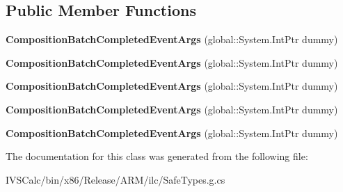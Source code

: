 \subsection*{Public Member Functions}
\begin{DoxyCompactItemize}
\item 
\mbox{\label{class_windows_1_1_u_i_1_1_composition_1_1_composition_batch_completed_event_args_afd03a8487feb85c144e6916a181ecdc1}} 
{\bfseries Composition\+Batch\+Completed\+Event\+Args} (global\+::\+System.\+Int\+Ptr dummy)
\item 
\mbox{\label{class_windows_1_1_u_i_1_1_composition_1_1_composition_batch_completed_event_args_afd03a8487feb85c144e6916a181ecdc1}} 
{\bfseries Composition\+Batch\+Completed\+Event\+Args} (global\+::\+System.\+Int\+Ptr dummy)
\item 
\mbox{\label{class_windows_1_1_u_i_1_1_composition_1_1_composition_batch_completed_event_args_afd03a8487feb85c144e6916a181ecdc1}} 
{\bfseries Composition\+Batch\+Completed\+Event\+Args} (global\+::\+System.\+Int\+Ptr dummy)
\item 
\mbox{\label{class_windows_1_1_u_i_1_1_composition_1_1_composition_batch_completed_event_args_afd03a8487feb85c144e6916a181ecdc1}} 
{\bfseries Composition\+Batch\+Completed\+Event\+Args} (global\+::\+System.\+Int\+Ptr dummy)
\item 
\mbox{\label{class_windows_1_1_u_i_1_1_composition_1_1_composition_batch_completed_event_args_afd03a8487feb85c144e6916a181ecdc1}} 
{\bfseries Composition\+Batch\+Completed\+Event\+Args} (global\+::\+System.\+Int\+Ptr dummy)
\end{DoxyCompactItemize}


The documentation for this class was generated from the following file\+:\begin{DoxyCompactItemize}
\item 
I\+V\+S\+Calc/bin/x86/\+Release/\+A\+R\+M/ilc/Safe\+Types.\+g.\+cs\end{DoxyCompactItemize}
